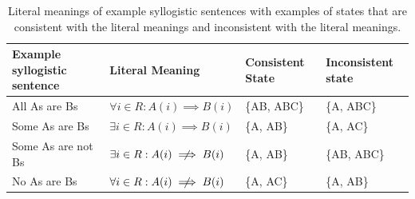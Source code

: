 \documentclass[floatsintext, doc]{apa6}
\begin{document}


\begin{table}[]
\begin{tabular}{@{}llll@{}}
\toprule
Example syllogistic sentence & Literal Meaning                                                                       & Consistent State & Inconsistent state \\ \midrule
All As are Bs                                      & $\forall i \in R: A(i) \implies B(i) $ & \{AB, ABC\}                           & \{A, ABC\}                              \\
Some As are Bs                                     & $\exists i \in R: A(i) \implies B(i) $ & \{A, AB\}                             & \{A, AC\}                               \\
Some As are not Bs                                 & $\exists i \in R: A(i)  \centernot \implies B(i) $ & \{A, AB\}                             & \{AB, ABC\}                             \\
No As are Bs                                       & $\forall i \in R: A(i) \centernot \implies B(i) $  & \{A, AC\}                             & \{A, AB\} \\ \bottomrule
\end{tabular}
\caption{Literal meanings of example syllogistic sentences with examples of states that are consistent with the literal meanings and inconsistent with the literal meanings.}
\label{tab:sem}
\end{table}
\end{document}
